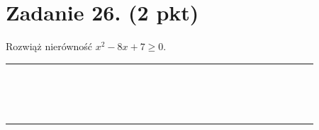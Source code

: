 \documentclass[10pt]{article}
\begin{document}
\section*{Zadanie 26. (2 pkt)}
Rozwiąż nierówność \(x^{2}-8 x+7 \geq 0\).

\begin{center}
\begin{tabular}{|c|c|c|c|c|c|c|c|c|c|c|c|c|c|c|c|c|c|c|c|c|c|c|c|c|c|c|c|c|c|c|}
\hline
 &  &  &  &  &  &  &  &  &  &  &  &  &  &  &  &  &  &  &  &  &  &  &  &  &  &  &  &  &  &  \\
\hline
 &  &  &  &  &  &  &  &  &  &  &  &  &  &  &  &  &  &  &  &  &  &  &  &  &  &  &  &  &  &  \\
\hline
 &  &  &  &  &  &  &  &  &  &  &  &  &  &  &  &  &  &  &  &  &  &  &  &  &  &  &  &  &  &  \\
\hline
 &  &  &  &  &  &  &  &  &  &  &  &  &  &  &  &  &  &  &  &  &  &  &  &  &  &  &  &  &  &  \\
\hline
 &  &  &  &  &  &  &  &  &  &  &  &  &  &  &  &  &  &  &  &  &  &  &  &  &  &  &  &  &  &  \\
\hline
 &  &  &  &  &  &  &  &  &  &  &  &  &  &  &  &  &  &  &  &  &  &  &  &  &  &  &  &  &  &  \\
\hline
 &  &  &  &  &  &  &  &  &  &  &  &  &  &  &  &  &  &  &  &  &  &  &  &  &  &  &  &  &  &  \\
\hline
 &  &  &  &  &  &  &  &  &  &  &  &  &  &  &  &  &  &  &  &  &  &  &  &  &  &  &  &  &  &  \\
\hline
 &  &  &  &  &  &  &  &  &  &  &  &  &  &  &  &  &  &  &  &  &  &  &  &  &  &  &  &  &  &  \\
\hline
 &  &  &  &  &  &  &  &  &  &  &  &  &  &  &  &  &  &  &  &  &  &  &  &  &  &  &  &  &  &  \\
\hline
 &  &  &  &  &  &  &  &  &  &  &  &  &  &  &  &  &  &  &  &  &  &  &  &  &  &  &  &  &  &  \\
\hline
 &  &  &  &  &  &  &  &  &  &  &  &  &  &  &  &  &  &  &  &  &  &  &  &  &  &  &  &  &  &  \\
\hline
 &  &  &  &  &  &  &  &  &  &  &  &  &  &  &  &  &  &  &  &  &  &  &  &  &  &  &  &  &  &  \\
\hline
 &  &  &  &  &  &  &  &  &  &  &  &  &  &  &  &  &  &  &  &  &  &  &  &  &  &  &  &  &  &  \\
\hline
 &  &  &  &  &  &  &  &  &  &  &  &  &  &  &  &  &  &  &  &  &  &  &  &  &  &  &  &  &  &  \\
\hline
 &  &  &  &  &  &  &  &  &  &  &  &  &  &  &  &  &  &  &  &  &  &  &  &  &  &  &  &  &  &  \\
\hline
 &  &  &  &  &  &  &  &  &  &  &  &  &  &  &  &  &  &  &  &  &  &  &  &  &  &  &  &  &  &  \\
\hline
\end{tabular}
\end{center}
\end{document}
